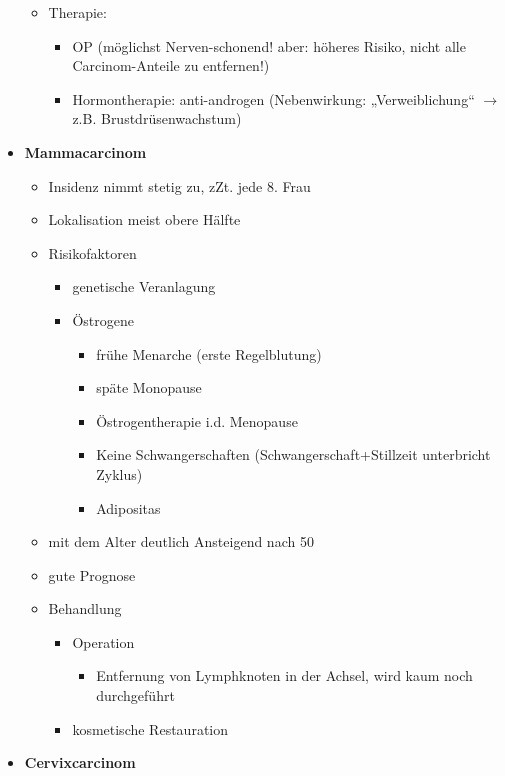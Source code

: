 \begin{itemize}
\begin{itemize}
					\item Therapie:
						\begin{itemize}
							\item OP (möglichst Nerven-schonend! aber: höheres Risiko, nicht alle Carcinom-Anteile zu entfernen!)
							\item Hormontherapie: anti-androgen (Nebenwirkung: „Verweiblichung“ $\rightarrow$ z.B. Brustdrüsenwachstum)
						\end{itemize}
				\end{itemize}
			\pagebreak
			\item \textbf{Mammacarcinom}
				\begin{itemize}
					\item Insidenz nimmt stetig zu, zZt. jede 8. Frau
					\item Lokalisation meist obere Hälfte
					\item Risikofaktoren
						\begin{itemize}
							\item genetische Veranlagung
							\item Östrogene
								\begin{itemize}
									\item frühe Menarche (erste Regelblutung)
									\item späte Monopause
									\item Östrogentherapie i.d. Menopause
									\item Keine Schwangerschaften (Schwangerschaft+Stillzeit unterbricht Zyklus)
									\item Adipositas
								\end{itemize}
						\end{itemize}
					\item mit dem Alter deutlich Ansteigend nach 50
					\item gute Prognose
					\item Behandlung
						\begin{itemize}
							\item Operation
								\begin{itemize}
									\item Entfernung von Lymphknoten in der Achsel, wird kaum noch durchgeführt
								\end{itemize}
							\item kosmetische Restauration
						\end{itemize}
				\end{itemize}
			\item \textbf{Cervixcarcinom}

\end{itemize}

